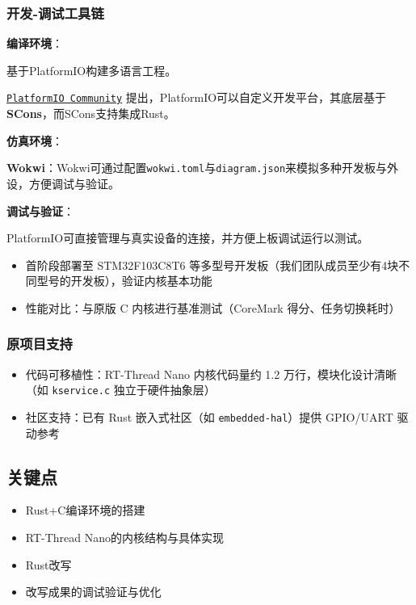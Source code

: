 \subsubsection{开发-调试工具链}

\textbf{编译环境}：

基于PlatformIO构建多语言工程。

\href{https://community.platformio.org/t/support-for-different-languages-and-compilers/921}{\texttt{PlatformIO Community}} 提出，PlatformIO可以自定义开发平台，其底层基于\textbf{SCons}，而SCons支持集成Rust。

\textbf{仿真环境}：

\textbf{Wokwi}：Wokwi可通过配置\texttt{wokwi.toml}与\texttt{diagram.json}来模拟多种开发板与外设，方便调试与验证。

\textbf{调试与验证}：

PlatformIO可直接管理与真实设备的连接，并方便上板调试运行以测试。
\begin{itemize}
    \item 首阶段部署至 STM32F103C8T6 等多型号开发板（我们团队成员至少有4块不同型号的开发板），验证内核基本功能
    \item 性能对比：与原版 C 内核进行基准测试（CoreMark 得分、任务切换耗时）
\end{itemize}

\subsubsection{原项目支持}

\begin{itemize}
    \item 代码可移植性：RT-Thread Nano 内核代码量约 1.2 万行，模块化设计清晰（如 \texttt{kservice.c} 独立于硬件抽象层）
    \item 社区支持：已有 Rust 嵌入式社区（如 \texttt{embedded-hal}）提供 GPIO/UART 驱动参考
\end{itemize}

\subsection{关键点}

\begin{itemize}
    \item Rust+C编译环境的搭建
    \item RT-Thread Nano的内核结构与具体实现
    \item Rust改写
    \item 改写成果的调试验证与优化
\end{itemize}


